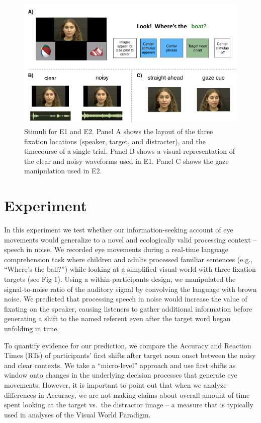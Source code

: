 \documentclass[10pt, letterpaper]{article}
\newenvironment{CodeChunk}{}{}
\begin{document}
\begin{CodeChunk}
\begin{figure}[tb]

{\centering \includegraphics[width=0.8\linewidth]{figs/stimuli_plot-1} 

}

\caption[Stimuli for E1 and E2]{Stimuli for E1 and E2. Panel A shows the layout of the three fixation locations (speaker, target, and distracter), and the timecourse of a single trial. Panel B shows a visual representation of the clear and noisy waveforms used in E1. Panel C shows the gaze manipulation used in E2.}\label{fig:stimuli_plot}
\end{figure}
\end{CodeChunk}

\section{Experiment}\label{experiment}

In this experiment we test whether our information-seeking account of
eye movements would generalize to a novel and ecologically valid
processing context -- speech in noise. We recorded eye movements during
a real-time language comprehension task where children and adults
processed familiar sentences (e.g., ``Where's the ball?'') while looking
at a simplified visual world with three fixation targets (see Fig 1).
Using a within-participants design, we manipulated the signal-to-noise
ratio of the auditory signal by convolving the language with brown
noise. We predicted that processing speech in noise would increase the
value of fixating on the speaker, causing listeners to gather additional
information before generating a shift to the named referent even after
the target word began unfolding in time.

To quantify evidence for our prediction, we compare the Accuracy and
Reaction Times (RTs) of participants' first shifts after target noun
onset between the noisy and clear contexts. We take a ``micro-level''
approach and use first shifts as window onto changes in the underlying
decision processes that generate eye movements. However, it is important
to point out that when we analyze differences in Accuracy, we are not
making claims about overall amount of time spent looking at the target
vs.~the distractor image -- a measure that is typically used in analyses
of the Visual World Paradigm.
\end{document}

